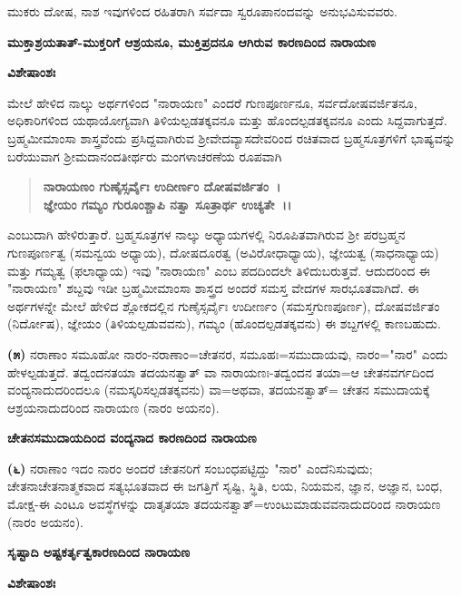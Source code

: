 ಮುಕರು ದೋಷ, ನಾಶ ಇವುಗಳಿಂದ ರಹಿತರಾಗಿ ಸರ್ವದಾ ಸ್ವರೂಪಾನಂದವನ್ನು ಅನುಭವಿಸುವವರು.

\begin{center}
\textbf{ಮುಕ್ತಾಶ್ರಯತಾತ್-ಮುಕ್ತರಿಗೆ ಆಶ್ರಯನೂ, ಮುಕ್ತಿಪ್ರದನೂ ಆಗಿರುವ ಕಾರಣದಿಂದ ನಾರಾಯಣ}
\end{center}

\noindent
\textbf{ವಿಶೇಷಾಂಶಃ\enginline{-}}

ಮೇಲೆ ಹೇಳಿದ ನಾಲ್ಕು ಅರ್ಥಗಳಿಂದ "ನಾರಾಯಣ" ಎಂದರೆ ಗುಣಪೂರ್ಣನೂ, ಸರ್ವದೋಷವರ್ಜಿತನೂ, ಅಧಿಕಾರಿಗಳಿಂದ ಯಥಾಯೋಗ್ಯವಾಗಿ ತಿಳಿಯಲ್ಪಡತಕ್ಕವನೂ ಮತ್ತು ಹೊಂದಲ್ಪಡತಕ್ಕವನೂ ಎಂದು ಸಿದ್ದವಾಗುತ್ತದೆ. ಬ್ರಹ್ಮಮೀಮಾಂಸಾ ಶಾಸ್ತ್ರವೆಂದು ಪ್ರಸಿದ್ದವಾಗಿರುವ ಶ‍್ರೀವೇದವ್ಯಾಸದೇವರಿಂದ ರಚಿತವಾದ ಬ್ರಹ್ಮಸೂತ್ರಗಳಿಗೆ ಭಾಷ್ಯವನ್ನು ಬರೆಯುವಾಗ ಶ‍್ರೀಮದಾನಂದತೀರ್ಥರು ಮಂಗಳಾಚರಣೆಯ ರೂಪವಾಗಿ

\begin{verse}
\textbf{ನಾರಾಯಣಂ ಗುಣೈಸ್ಸರ್ವೈಃ ಉದೀರ್ಣಂ ದೋಷವರ್ಜಿತಂ~।}\\\textbf{ಜ್ಞೇಯಂ ಗಮ್ಯಂ ಗುರೂಂಶ್ಚಾಪಿ ನತ್ವಾ ಸೂತ್ರಾರ್ಥ ಉಚ್ಯತೇ~।।}
\end{verse}

\noindent
ಎಂಬುದಾಗಿ ಹೇಳಿರುತ್ತಾರೆ. ಬ್ರಹ್ಮಸೂತ್ರಗಳ ನಾಲ್ಕು ಅಧ್ಯಾಯಗಳಲ್ಲಿ ನಿರೂಪಿತವಾಗಿರುವ ಶ‍್ರೀ ಪರಬ್ರಹ್ಮನ ಗುಣಪೂರ್ಣತ್ವ (ಸಮನ್ವಯ ಅಧ್ಯಾಯ), ದೋಷದೂರತ್ವ (ಅವಿರೋಧಾಧ್ಯಾಯ), ಜ್ಞೇಯತ್ವ (ಸಾಧನಾಧ್ಯಾಯ) ಮತ್ತು ಗಮ್ಯತ್ವ (ಫಲಾಧ್ಯಾಯ) ಇವು "ನಾರಾಯಣ" ಎಂಬ ಪದದಿಂದಲೇ ತಿಳಿದುಬರುತ್ತವೆ. ಆದುದರಿಂದ ಈ "ನಾರಾಯಣ" ಶಬ್ದವು ಇಡೀ ಬ್ರಹ್ಮಮೀಮಾಂಸಾ ಶಾಸ್ತ್ರದ ಅಂದರೆ ಸಮಸ್ತ ವೇದಗಳ ಸಾರಭೂತವಾಗಿದೆ. ಈ ಅರ್ಥಗಳನ್ನೇ ಮೇಲೆ ಹೇಳಿದ ಶ್ಲೋಕದಲ್ಲಿನ ಗುಣೈಸ್ಸರ್ವೈಃ ಉದೀರ್ಣಂ (ಸಮಸ್ತಗುಣಪೂರ್ಣ), ದೋಷವರ್ಜಿತಂ (ನಿರ್ದೋಷ), ಜ್ಞೇಯಂ (ತಿಳಿಯಲ್ಪಡುವವನು), ಗಮ್ಯಂ (ಹೊಂದಲ್ಪಡತಕ್ಕವನು) ಈ ಶಬ್ದಗಳಲ್ಲಿ ಕಾಣಬಹುದು.

\textbf{(೫)} ನರಾಣಾಂ ಸಮೂಹೋ ನಾರಂ-ನರಾಣಾಂ=ಚೇತನರ, ಸಮೂಹಃ=ಸಮುದಾ\-ಯವು, ನಾರಂ="ನಾರ" ಎಂದು ಹೇಳಲ್ಪಡುತ್ತದೆ. ತದ್ವಂದನತಯಾ ತದಯನತ್ವಾತ್ ವಾ ನಾರಾಯಣಃ-ತದ್ವಂದನ ತಯಾ=ಆ ಚೇತನವರ್ಗದಿಂದ ವಂದ್ಯನಾದುದರಿಂದಲೂ (ನಮಸ್ಕರಿಸಲ್ಪಡತಕ್ಕವನು) ವಾ=ಅಥವಾ, ತದಯನತ್ವಾತ್= ಚೇತನ ಸಮುದಾಯಕ್ಕೆ ಆಶ್ರಯನಾದುದರಿಂದ ನಾರಾಯಣ (ನಾರಂ ಅಯನಂ).

\begin{center}
\textbf{ಚೇತನಸಮುದಾಯದಿಂದ ವಂದ್ಯನಾದ ಕಾರಣದಿಂದ ನಾರಾಯಣ}
\end{center}

\textbf{(೬)} ನರಾಣಾಂ ಇದಂ ನಾರಂ ಅಂದರೆ ಚೇತನರಿಗೆ ಸಂಬಂಧಪಟ್ಟಿದ್ದು "ನಾರ" ಎಂದೆನಿಸುವುದು; ಚೇತನಾಚೇತನಾತ್ಮಕವಾದ ಸತ್ಯಭೂತವಾದ ಈ ಜಗತ್ತಿಗೆ ಸೃಷ್ಟಿ, ಸ್ಥಿತಿ, ಲಯ, ನಿಯಮನ, ಜ್ಞಾನ, ಅಜ್ಞಾನ, ಬಂಧ, ಮೋಕ್ಷ-ಈ ಎಂಟೂ ಅವಸ್ಥೆಗಳನ್ನು ದಾತೃತಯಾ ತದಯನತ್ವಾತ್=ಉಂಟುಮಾಡುವವನಾದುದರಿಂದ ನಾರಾಯಣ (ನಾರಂ ಅಯನಂ).

\begin{center}
\textbf{ಸೃಷ್ಟಾದಿ ಅಷ್ಟಕರ್ತೃತ್ವಕಾರಣದಿಂದ ನಾರಾಯಣ}
\end{center}

\noindent
\textbf{ವಿಶೇಷಾಂಶಃ\enginline{-}}

